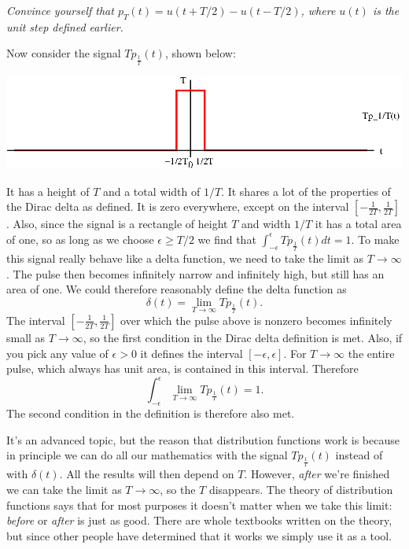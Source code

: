 \documentclass[10pt]{beamer}
\begin{document}
{\em Convince yourself that $p_T(t) = u(t + T/2) - u(t - T/2)$, where $u(t)$ is the unit step defined earlier.}

Now consider the signal $T p_{\frac{1}{T}}(t)$, shown below:
\begin{center}
  \includegraphics{diracrect}
\end{center}
It has a height of $T$ and a total width of $1/T$.  It shares a lot of the properties of the Dirac delta as defined.  It is zero everywhere, except on the interval $[-\frac{1}{2T}, \frac{1}{2T}]$.  Also, since the signal is a rectangle of height $T$ and width $1/T$ it has a total area of one, so as long as we choose $\epsilon \geq T/2$ we find that $\int_{-\epsilon}^{\epsilon} T p_{\frac{1}{T}}(t) dt = 1$.  To make this signal really behave like a delta function, we need to take the limit as $T \to \infty$.  The pulse then becomes infinitely narrow and infinitely high, but still has an area of one.  We could therefore reasonably define the delta function as
\begin{equation*}
  \delta(t) = \lim_{T \to \infty} T p_{\frac{1}{T}}(t).
\end{equation*}
The interval $[-\frac{1}{2T}, \frac{1}{2T}]$ over which the pulse above is nonzero becomes infinitely small as $T \to \infty$, so the first condition in the Dirac delta definition is met.  Also, if you pick any value of $\epsilon > 0$ it defines the interval $[-\epsilon, \epsilon]$.  For $T \to \infty$ the entire pulse, which always has unit area, is contained in this interval.  Therefore
\begin{equation*}
  \int_{-\epsilon}^{\epsilon} \lim_{T \to \infty} T p_{\frac{1}{T}}(t) = 1.
\end{equation*}
The second condition in the definition is therefore also met.

It's an advanced topic, but the reason that distribution functions work is because in principle we can do all our mathematics with the signal $T p_{\frac{1}{T}}(t)$ instead of with $\delta(t)$.  All the results will then depend on $T$.  However, {\em after} we're finished we can take the limit as $T \to \infty$, so the $T$ disappears.  The theory of distribution functions says that for most purposes it doesn't matter when we take this limit:  {\em before} or {\em after} is just as good.  There are whole textbooks written on the theory, but since other people have determined that it works we simply use it as a tool.
\end{document}
